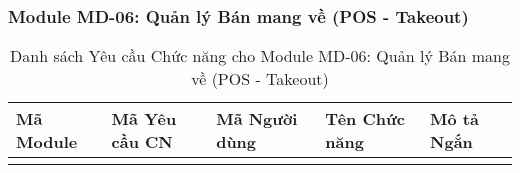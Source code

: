\subsubsection{Module MD-06: Quản lý Bán mang về (POS - Takeout)}

\begin{longtable}{|m{2cm}|m{2.5cm}|m{2.5cm}|m{4.5cm}|m{4cm}|}
\caption{Danh sách Yêu cầu Chức năng cho Module MD-06: Quản lý Bán mang về (POS - Takeout)} \label{tab:fr_md06} \\
\hline
\textbf{Mã Module} & \textbf{Mã Yêu cầu CN} & \textbf{Mã Người dùng} & \textbf{Tên Chức năng} & \textbf{Mô tả Ngắn} \\
\hline
\endhead %

\hline
\endfoot %

\hline
\endlastfoot %


\end{longtable}
